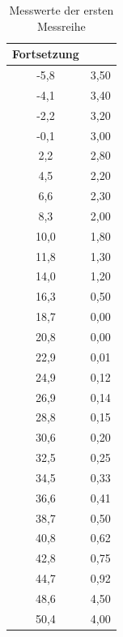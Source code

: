 \begin{table}
\begin{minipage}{0.45\textwidth}
\begin{tabular}{c|c}
Fortsetzung & \\\hline
-5,8	&3,50\\\hline
-4,1	&3,40\\\hline
-2,2	&3,20\\\hline
-0,1	&3,00\\\hline
2,2		&2,80\\\hline
4,5		&2,20\\\hline
6,6		&2,30\\\hline
8,3		&2,00\\\hline
10,0	&1,80\\\hline
11,8	&1,30\\\hline
14,0	&1,20\\\hline
16,3	&0,50\\\hline
18,7	&0,00\\\hline
20,8	&0,00\\\hline
22,9	&0,01\\\hline
24,9	&0,12\\\hline
26,9	&0,14\\\hline
28,8	&0,15\\\hline
30,6	&0,20\\\hline
32,5	&0,25\\\hline
34,5	&0,33\\\hline
36,6	&0,41\\\hline
38,7	&0,50\\\hline
40,8	&0,62\\\hline
42,8	&0,75\\\hline
44,7	&0,92\\\hline
48,6	&4,50\\\hline
50,4	&4,00\\\hline
\end{tabular}
\end{minipage}
\caption{Messwerte der ersten Messreihe}
\label{tab_werte1}
\end{table}

